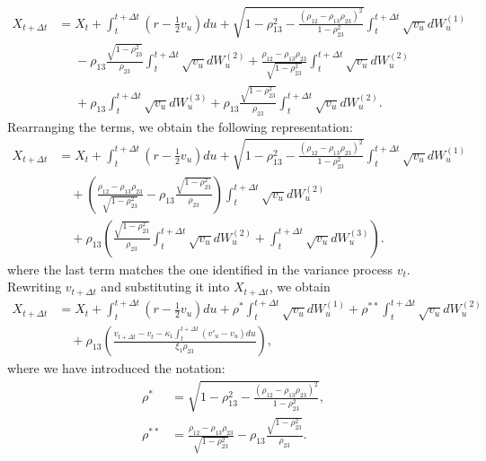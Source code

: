 \documentclass[graybox]{svmult}
\begin{document}
\begin{align*}
X_{t+\Delta t} &= X_t + \int_t^{t+\Delta t} \left(r - \frac{1}{2} v_u \right) du 
+ \sqrt{1 - \rho_{13}^2 - \frac{(\rho_{12} - \rho_{13} \rho_{23})^2}{1 - \rho_{23}^2}} \int_t^{t+\Delta t} \sqrt{v_u} dW_u^{(1)} \\
&\phantom{=} - \rho_{13} \frac{\sqrt{1 - \rho_{23}^2}}{\rho_{23}} \int_t^{t+\Delta t} \sqrt{v_u} dW_u^{(2)} 
+ \frac{\rho_{12} - \rho_{13} \rho_{23}}{\sqrt{1 - \rho_{23}^2}} \int_t^{t+\Delta t} \sqrt{v_u} dW_u^{(2)} \\
&\phantom{=} + \rho_{13} \int_t^{t+\Delta t} \sqrt{v_u} dW_u^{(3)} 
+ \rho_{13} \frac{\sqrt{1 - \rho_{23}^2}}{\rho_{23}} \int_t^{t+\Delta t} \sqrt{v_u} dW_u^{(2)}.
\end{align*}
Rearranging the terms, we obtain the following representation:
\begin{align*}
X_{t+\Delta t} &= X_t + \int_t^{t+\Delta t} \left(r - \frac{1}{2} v_u \right) du 
+ \sqrt{1 - \rho_{13}^2 - \frac{(\rho_{12} - \rho_{13} \rho_{23})^2}{1 - \rho_{23}^2}} \int_t^{t+\Delta t} \sqrt{v_u} dW_u^{(1)} \\
&\quad + \left( \frac{\rho_{12} - \rho_{13} \rho_{23}}{\sqrt{1 - \rho_{23}^2}} - \rho_{13} \frac{\sqrt{1 - \rho_{23}^2}}{\rho_{23}} \right) \int_t^{t+\Delta t} \sqrt{v_u} dW_u^{(2)} \\
&\quad + \rho_{13} \left( \frac{\sqrt{1 - \rho_{23}^2}}{\rho_{23}} \int_t^{t+\Delta t} \sqrt{v_u} dW_u^{(2)} 
+ \int_t^{t+\Delta t} \sqrt{v_u} dW_u^{(3)} \right).
\end{align*}
where the last term matches the one identified in the variance process $v_t$. 
Rewriting $v_{t+\Delta t}$ and substituting it into $X_{t+\Delta t}$, we obtain
\begin{align*}
X_{t+\Delta t} &= X_t + \int_{t}^{t+\Delta t} \left( r - \frac{1}{2} v_u \right) du + \rho^* \int_{t}^{t+\Delta t} \sqrt{v_u} dW_u^{(1)} + \rho^{**} \int_{t}^{t+\Delta t} \sqrt{v_u} dW_u^{(2)} \\
&\quad+ \rho_{13} \left( \frac{v_{t+\Delta t} - v_t - \kappa_1 \int_{t}^{t+\Delta t} (v'_u - v_u) du}{\xi_1 \rho_{23}} \right),
\end{align*}
where we have introduced the notation:
\begin{align*}
\rho^* &= \sqrt{1 - \rho^2_{13} - \frac{(\rho_{12} - \rho_{13} \rho_{23})^2}{1 - \rho^2_{23}}},\\
\rho^{**} &= \frac{\rho_{12} - \rho_{13} \rho_{23}}{\sqrt{1 - \rho^2_{23}}} - \rho_{13} \frac{\sqrt{1 - \rho_{23}^2}}{\rho_{23}}.
\end{align*}
\end{document}

